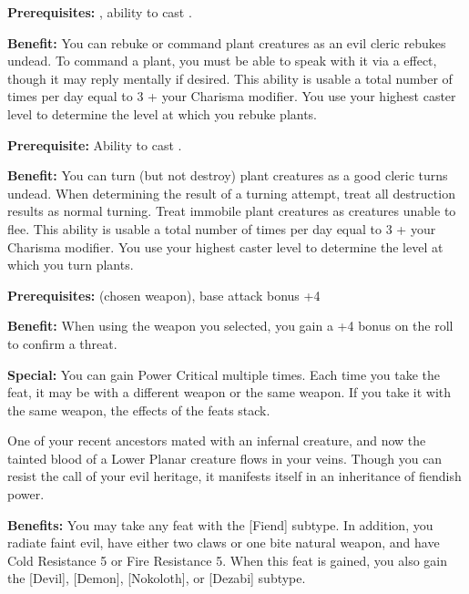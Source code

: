 
\textbf{Prerequisites:} , ability to cast .

\textbf{Benefit:} You can rebuke or command plant creatures as an evil cleric rebukes undead. To command a plant, you must be able to speak with it via a  effect, though it may reply mentally if desired. This ability is usable a total number of times per day equal to 3 + your Charisma modifier. You use your highest caster level to determine the level at which you rebuke plants.


\textbf{Prerequisite:} Ability to cast .

\textbf{Benefit:} You can turn (but not destroy) plant creatures as a good cleric turns undead. When determining the result of a turning attempt, treat all destruction results as normal turning. Treat immobile plant creatures as creatures unable to flee. This ability is usable a total number of times per day equal to 3 + your Charisma modifier. You use your highest caster level to determine the level at which you turn plants.


\textbf{Prerequisites:}  (chosen weapon), base attack bonus +4

\textbf{Benefit:} When using the weapon you selected, you gain a +4 bonus on the roll to confirm a threat.

\textbf{Special:} You can gain Power Critical multiple times. Each time you take the feat, it may be with a different weapon or the same weapon.  If you take it with the same weapon, the effects of the feats stack.


One of your recent ancestors mated with an infernal creature, and now the tainted blood of a Lower Planar creature flows in your veins. Though you can resist the call of your evil heritage, it manifests itself in an inheritance of fiendish power.

\textbf{Benefits:} You may take any feat with the [Fiend] subtype. In addition, you radiate faint evil, have either two claws or one bite natural weapon, and have Cold Resistance 5 or Fire Resistance 5. When this feat is gained, you also gain the [Devil], [Demon], [Nokoloth], or [Dezabi] subtype.

